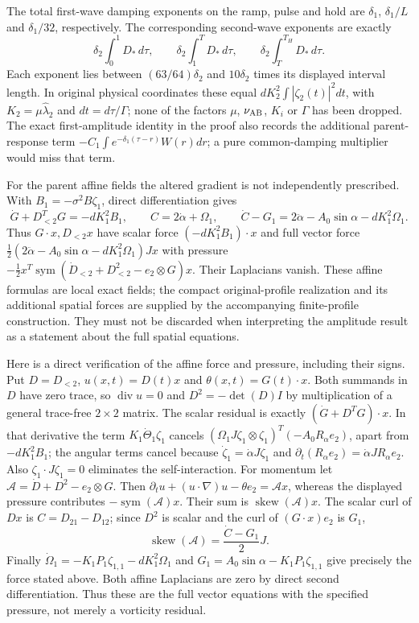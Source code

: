 The total first-wave damping exponents on the ramp, pulse and hold are
$\delta_1$, $\delta_1/L$ and $\delta_1/32$, respectively.
The corresponding second-wave exponents are exactly
\[
 \delta_2\int_0^1D_*\,d\tau,\qquad
 \delta_2\int_1^T D_*\,d\tau,\qquad
 \delta_2\int_T^{T_H}D_*\,d\tau.
\]
Each exponent lies between $(63/64)\delta_2$ and $10\delta_2$
times its displayed interval length. In original physical coordinates
these equal $dK_2^2\int|\zeta_2(t)|^2dt$, with
$K_2=\mu\widehat\lambda_2$ and $dt=d\tau/\Gamma$; none of
the factors $\mu$, $\nu_{\rm AB}$, $K_i$ or $\Gamma$ has been dropped.
The exact first-amplitude identity in the proof also records the
additional parent-response term
$-C_1\int e^{-\delta_1(\tau-r)}W(r)dr$; a pure common-damping
multiplier would miss that term.

For the parent affine fields the altered gradient is not independently
prescribed. With $B_1=-\sigma^2B\zeta_1$, direct differentiation gives
\[
 \dot G+D_{<2}^{T}G=-dK_1^2B_1,
 \qquad C=2\dot\alpha+\Omega_1,
 \qquad\dot C-G_1=2\ddot\alpha-A_0\sin\alpha-dK_1^2\Omega_1.
\]
Thus $G\cdot x,D_{<2}x$ have scalar force
$(-dK_1^2B_1)\cdot x$ and full vector force
$\tfrac12(2\ddot\alpha-A_0\sin\alpha-dK_1^2\Omega_1)Jx$
with pressure
$-\tfrac12x^T\operatorname{sym}(\dot D_{<2}+D_{<2}^2-e_2\otimes G)x$.
Their Laplacians vanish. These affine formulas are local exact fields;
the compact original-profile realization and its additional spatial
forces are supplied by the accompanying finite-profile construction.
They must not be discarded when interpreting the amplitude result
as a statement about the full spatial equations.

Here is a direct verification of the affine force and pressure, including
their signs. Put $D=D_{<2}$, $u(x,t)=D(t)x$ and
$\theta(x,t)=G(t)\cdot x$. Both summands in $D$ have zero trace, so
$\operatorname{div}u=0$ and
$D^2=-\det(D)I$ by multiplication of a general trace-free
$2\times2$ matrix. The scalar residual is exactly
$(\dot G+D^TG)\cdot x$. In that derivative the term
$K_1\dot\Theta_1\zeta_1$ cancels
$(\Omega_1J\zeta_1\otimes\zeta_1)^T(-A_0R_\alpha e_2)$,
apart from $-dK_1^2B_1$; the angular terms cancel because
$\dot\zeta_1=\dot\alpha J\zeta_1$ and
$\partial_t(R_\alpha e_2)=\dot\alpha J R_\alpha e_2$.
Also $\zeta_1\cdot J\zeta_1=0$ eliminates the self-interaction.
For momentum let
$\mathcal A=\dot D+D^2-e_2\otimes G$.
Then
$\partial_tu+(u\cdot\nabla)u-\theta e_2=\mathcal A x$,
whereas the displayed pressure contributes
$-\operatorname{sym}(\mathcal A)x$.
Their sum is $\operatorname{skew}(\mathcal A)x$.
The scalar curl of $Dx$ is $C=D_{21}-D_{12}$; since $D^2$ is
scalar and the curl of $(G\cdot x)e_2$ is $G_1$,
\[
 \operatorname{skew}(\mathcal A)
 =\frac{\dot C-G_1}{2}J.
\]
Finally $\dot\Omega_1=-K_1P_1\zeta_{1,1}-dK_1^2\Omega_1$
and $G_1=A_0\sin\alpha-K_1P_1\zeta_{1,1}$ give precisely
the force stated above. Both affine Laplacians are zero by direct
second differentiation. Thus these are the full vector equations with
the specified pressure, not merely a vorticity residual.


